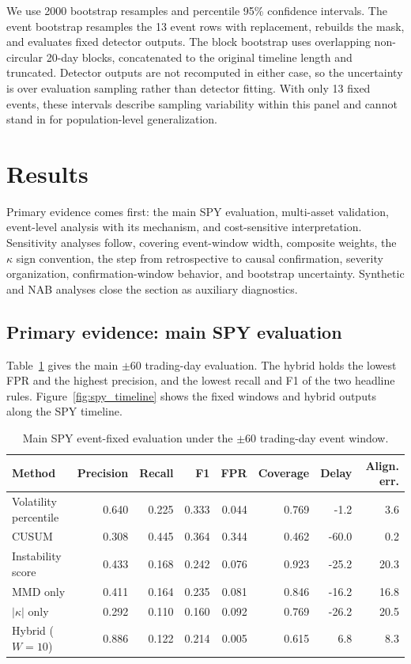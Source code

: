 \documentclass[pdflatex,sn-mathphys-num,iicol]{sn-jnl}
\begin{document}
We use 2000 bootstrap resamples and percentile 95\% confidence intervals. The event bootstrap resamples the 13 event rows with replacement, rebuilds the mask, and evaluates fixed detector outputs. The block bootstrap uses overlapping non-circular 20-day blocks, concatenated to the original timeline length and truncated. Detector outputs are not recomputed in either case, so the uncertainty is over evaluation sampling rather than detector fitting. With only 13 fixed events, these intervals describe sampling variability within this panel and cannot stand in for population-level generalization.

\section{Results}
\label{sec:results}
Primary evidence comes first: the main SPY evaluation, multi-asset validation, event-level analysis with its mechanism, and cost-sensitive interpretation. Sensitivity analyses follow, covering event-window width, composite weights, the $\kappa$ sign convention, the step from retrospective to causal confirmation, severity organization, confirmation-window behavior, and bootstrap uncertainty. Synthetic and NAB analyses close the section as auxiliary diagnostics.

\subsection{Primary evidence: main SPY evaluation}
Table~\ref{tab:spy} gives the main $\pm60$ trading-day evaluation. The hybrid holds the lowest FPR and the highest precision, and the lowest recall and F1 of the two headline rules. Figure~\ref{fig:spy_timeline} shows the fixed windows and hybrid outputs along the SPY timeline.

\begin{table}[t]
\centering
\caption{Main SPY event-fixed evaluation under the $\pm60$ trading-day event window.}
\label{tab:spy}
\begin{tabular}{lrrrrrrr}
\toprule
Method & Precision & Recall & F1 & FPR & Coverage & Delay & Align. err.\\
\midrule
Volatility percentile & 0.640 & 0.225 & 0.333 & 0.044 & 0.769 & -1.2 & 3.6\\
CUSUM & 0.308 & 0.445 & 0.364 & 0.344 & 0.462 & -60.0 & 0.2\\
Instability score & 0.433 & 0.168 & 0.242 & 0.076 & 0.923 & -25.2 & 20.3\\
MMD only & 0.411 & 0.164 & 0.235 & 0.081 & 0.846 & -16.2 & 16.8\\
$|\kappa|$ only & 0.292 & 0.110 & 0.160 & 0.092 & 0.769 & -26.2 & 20.5\\
Hybrid ($W=10$) & 0.886 & 0.122 & 0.214 & 0.005 & 0.615 & 6.8 & 8.3\\
\bottomrule
\end{tabular}
\end{table}
\end{document}
